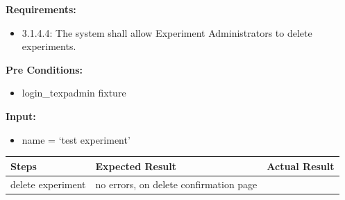 \documentclass[letterpaper,10pt,english]{sphinxmanual}
\begin{document}

\begin{fulllineitems}
\label{STD/test_experiment:test_experiment.test_delete_experiment}
\textbf{Requirements:}
\begin{itemize}
\item {} 
3.1.4.4: The system shall allow Experiment Administrators to delete experiments.

\end{itemize}

\textbf{Pre Conditions:}
\begin{itemize}
\item {} 
login\_texpadmin fixture

\end{itemize}

\textbf{Input:}
\begin{itemize}
\item {} 
name = `test experiment'

\end{itemize}

\begin{tabulary}{\linewidth}{|L|L|L|}
\hline
\textsf{\relax 
Steps
} & \textsf{\relax 
Expected Result
} & \textsf{\relax 
Actual Result
}\\
\hline
delete experiment
 & 
no errors, on delete confirmation page
 & \\
\hline\end{tabulary}


\end{fulllineitems}

\end{document}
